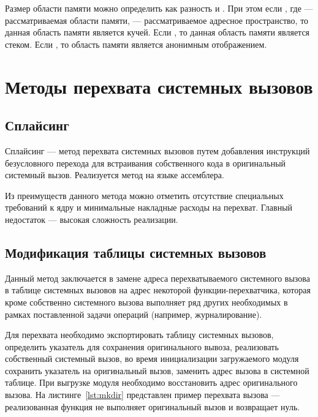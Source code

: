 

Размер области памяти можно определить как разность  и . При этом если , где  --- рассматриваемая области памяти,  --- рассматриваемое адресное пространство, то данная область памяти является кучей. Если , то данная область памяти является стеком. Если , то область памяти является анонимным отображением.

\section{Методы перехвата системных вызовов}

\subsection{Сплайсинг}

Сплайсинг --- метод перехвата системных вызовов путем добавления инструкций безусловного перехода для встраивания собственного кода в оригинальный системный вызов. Реализуется метод на языке ассемблера.

Из преимуществ данного метода можно отметить отсутствие специальных требований к ядру и минимальные накладные расходы на перехват. Главный недостаток --- высокая сложность реализации.

\subsection{Модификация таблицы системных вызовов}

Данный метод заключается в замене адреса перехватываемого системного вызова в таблице системных вызовов на адрес некоторой функции-перехватчика, которая кроме собственно системного вызова выполняет ряд других необходимых в рамках поставленной задачи операций (например, журналирование).

Для перехвата необходимо экспортировать таблицу системных вызовов, определить указатель для сохранения оригинального вывоза, реализовать собственный системный вызов, во время инициализации загружаемого модуля сохранить указатель на оригинальный вызов, заменить адрес вызова в системной таблице. При выгрузке модуля необходимо восстановить адрес оригинального вызова. На листинге~\ref{lst:mkdir} представлен пример перехвата вызова  --- реализованная функция не выполняет оригинальный вызов и возвращает нуль.

